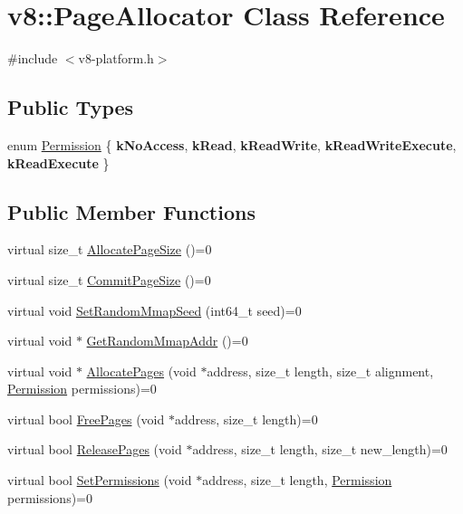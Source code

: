 \hypertarget{classv8_1_1PageAllocator}{}\section{v8\+:\+:Page\+Allocator Class Reference}
\label{classv8_1_1PageAllocator}


{\ttfamily \#include $<$v8-\/platform.\+h$>$}

\subsection*{Public Types}
\begin{DoxyCompactItemize}
\item 
enum \mbox{\hyperlink{classv8_1_1PageAllocator_a88f74b164fe97e053259f67a95758415}{Permission}} \{ \newline
{\bfseries k\+No\+Access}, 
{\bfseries k\+Read}, 
{\bfseries k\+Read\+Write}, 
{\bfseries k\+Read\+Write\+Execute}, 
\newline
{\bfseries k\+Read\+Execute}
 \}
\end{DoxyCompactItemize}
\subsection*{Public Member Functions}
\begin{DoxyCompactItemize}
\item 
virtual size\+\_\+t \mbox{\hyperlink{classv8_1_1PageAllocator_a92c2f6dbb3afa6c47dafd4c12ab4641f}{Allocate\+Page\+Size}} ()=0
\item 
virtual size\+\_\+t \mbox{\hyperlink{classv8_1_1PageAllocator_ad817d87004151e3824997415f2dc57e9}{Commit\+Page\+Size}} ()=0
\item 
virtual void \mbox{\hyperlink{classv8_1_1PageAllocator_a9481a73527915fd200f6e1e9ed4b3eba}{Set\+Random\+Mmap\+Seed}} (int64\+\_\+t seed)=0
\item 
virtual void $\ast$ \mbox{\hyperlink{classv8_1_1PageAllocator_a37f194f9c5fdbe5105476cbd1432418c}{Get\+Random\+Mmap\+Addr}} ()=0
\item 
virtual void $\ast$ \mbox{\hyperlink{classv8_1_1PageAllocator_ab3a25ddd2601701f80ee67c4bf017ef7}{Allocate\+Pages}} (void $\ast$address, size\+\_\+t length, size\+\_\+t alignment, \mbox{\hyperlink{classv8_1_1PageAllocator_a88f74b164fe97e053259f67a95758415}{Permission}} permissions)=0
\item 
virtual bool \mbox{\hyperlink{classv8_1_1PageAllocator_abc2e3fdc768aba7d35ce0cf44f14586c}{Free\+Pages}} (void $\ast$address, size\+\_\+t length)=0
\item 
virtual bool \mbox{\hyperlink{classv8_1_1PageAllocator_a6eb6bd93c8880dd022a61a13c65f66c0}{Release\+Pages}} (void $\ast$address, size\+\_\+t length, size\+\_\+t new\+\_\+length)=0
\item 
virtual bool \mbox{\hyperlink{classv8_1_1PageAllocator_aa3817d5bfaba9ec280a6cfb60e6adda0}{Set\+Permissions}} (void $\ast$address, size\+\_\+t length, \mbox{\hyperlink{classv8_1_1PageAllocator_a88f74b164fe97e053259f67a95758415}{Permission}} permissions)=0
\end{DoxyCompactItemize}


